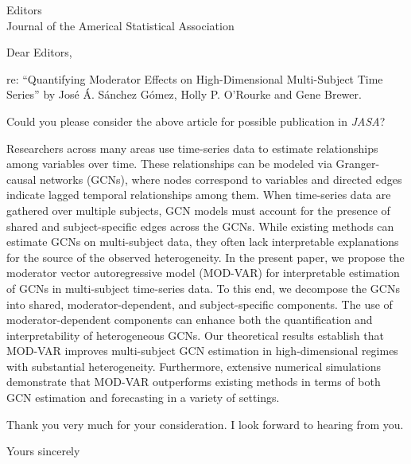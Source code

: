 \documentclass[11pt,letterpaper]{letter}
\begin{document}
\date{}


\begin{letter}{%
Editors\\
Journal of the Americal Statistical Association}

\opening{Dear Editors,}

\bigskip
re: ``Quantifying Moderator Effects on High-Dimensional Multi-Subject Time Series'' by José Á. Sánchez Gómez, Holly P. O'Rourke and Gene Brewer. 

\bigskip

Could you please consider the above article for possible publication in {\em JASA}? 

	Researchers across many areas use time-series data to estimate relationships among variables over time. These relationships can be modeled via Granger-causal networks (GCNs), where nodes correspond to variables and directed edges indicate lagged temporal relationships among them. When time-series data are gathered over multiple subjects, GCN models must account for the presence of shared and subject-specific edges across the GCNs. While existing methods can estimate GCNs on multi-subject data, they often lack interpretable explanations for the source of the observed heterogeneity. In the present paper, we propose the moderator vector autoregressive model (MOD-VAR) for interpretable estimation of GCNs in multi-subject time-series data. To this end, we decompose the GCNs into shared, moderator-dependent, and subject-specific components. The use of moderator-dependent components can enhance both the quantification and interpretability of heterogeneous GCNs. Our theoretical results establish that MOD-VAR improves multi-subject GCN estimation in high-dimensional regimes with substantial heterogeneity. Furthermore, extensive numerical simulations demonstrate that MOD-VAR outperforms existing methods in terms of both GCN estimation and forecasting in a variety of settings.  

Thank you very much for your consideration. I look forward to hearing from you.

\closing{Yours sincerely}

\end{letter}
\end{document}
